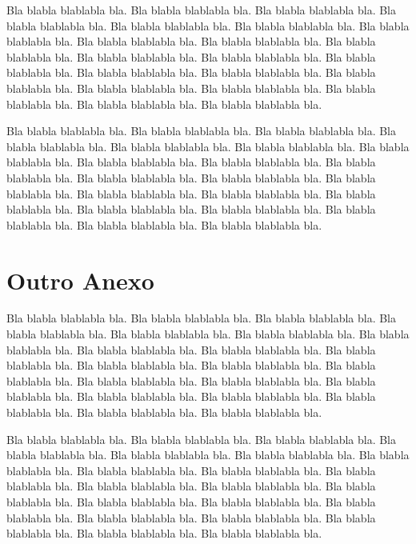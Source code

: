 \documentclass[tese,capa]{texufpel}
\begin{document}
Bla blabla blablabla bla.  Bla blabla blablabla bla.  Bla blabla
blablabla bla.  Bla blabla blablabla bla.  Bla blabla blablabla bla.
Bla blabla blablabla bla.  Bla blabla blablabla bla.  Bla blabla
blablabla bla.  Bla blabla blablabla bla.  Bla blabla blablabla bla.
Bla blabla blablabla bla.  Bla blabla blablabla bla.  Bla blabla
blablabla bla.  Bla blabla blablabla bla.  Bla blabla blablabla bla.
Bla blabla blablabla bla.  Bla blabla blablabla bla.  Bla blabla
blablabla bla.  Bla blabla blablabla bla.  Bla blabla blablabla bla.
Bla blabla blablabla bla.

Bla blabla blablabla bla.  Bla blabla blablabla bla.  Bla blabla
blablabla bla.  Bla blabla blablabla bla.  Bla blabla blablabla bla.
Bla blabla blablabla bla.  Bla blabla blablabla bla.  Bla blabla
blablabla bla.  Bla blabla blablabla bla.  Bla blabla blablabla bla.
Bla blabla blablabla bla.  Bla blabla blablabla bla.  Bla blabla
blablabla bla.  Bla blabla blablabla bla.  Bla blabla blablabla bla.
Bla blabla blablabla bla.  Bla blabla blablabla bla.  Bla blabla
blablabla bla.  Bla blabla blablabla bla.  Bla blabla blablabla bla.
Bla blabla blablabla bla.

\chapter{Outro Anexo}

Bla blabla blablabla bla.  Bla blabla blablabla bla.  Bla blabla
blablabla bla.  Bla blabla blablabla bla.  Bla blabla blablabla bla.
Bla blabla blablabla bla.  Bla blabla blablabla bla.  Bla blabla
blablabla bla.  Bla blabla blablabla bla.  Bla blabla blablabla bla.
Bla blabla blablabla bla.  Bla blabla blablabla bla.  Bla blabla
blablabla bla.  Bla blabla blablabla bla.  Bla blabla blablabla bla.
Bla blabla blablabla bla.  Bla blabla blablabla bla.  Bla blabla
blablabla bla.  Bla blabla blablabla bla.  Bla blabla blablabla bla.
Bla blabla blablabla bla.

Bla blabla blablabla bla.  Bla blabla blablabla bla.  Bla blabla
blablabla bla.  Bla blabla blablabla bla.  Bla blabla blablabla bla.
Bla blabla blablabla bla.  Bla blabla blablabla bla.  Bla blabla
blablabla bla.  Bla blabla blablabla bla.  Bla blabla blablabla bla.
Bla blabla blablabla bla.  Bla blabla blablabla bla.  Bla blabla
blablabla bla.  Bla blabla blablabla bla.  Bla blabla blablabla bla.
Bla blabla blablabla bla.  Bla blabla blablabla bla.  Bla blabla
blablabla bla.  Bla blabla blablabla bla.  Bla blabla blablabla bla.
Bla blabla blablabla bla.
\end{document}
